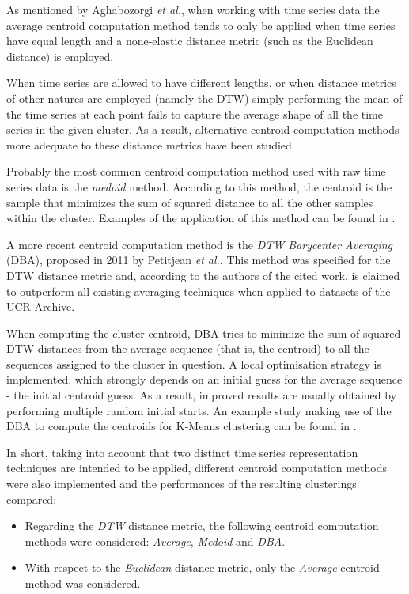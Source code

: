 \documentclass[9pt,journal,compsoc]{IEEEtran}
\begin{document}
As mentioned by Aghabozorgi \emph{et al.}\cite{aghabozorgi2015time}, when working with time series data the average centroid computation method tends to only be applied when time series have equal length and a none-elastic distance metric (such as the Euclidean distance) is employed.

When time series are allowed to have different lengths, or when distance metrics of other natures are employed (namely the DTW) simply performing the mean of the time series at each point fails to capture the average shape of all the time series in the given cluster. As a result, alternative centroid computation methods more adequate to these distance metrics have been studied.

Probably the most common centroid computation method used with raw time series data is the \emph{medoid} method. According to this method, the centroid is the sample that minimizes the sum of squared distance to all the other samples within the cluster. Examples of the application of this method can be found in \cite{liao2006adaptive, izakian2015fuzzy}.

A more recent centroid computation method is the \emph{DTW Barycenter Averaging} (DBA)\cite{petitjean2011global}, proposed in 2011 by Petitjean \emph{et al.}. This method was specified for the DTW distance metric and, according to the authors of the cited work, is claimed to outperform all existing averaging techniques when applied to datasets of the UCR Archive\cite{keogh2006ucr}.

When computing the cluster centroid, DBA tries to minimize the sum of squared DTW distances from the average sequence (that is, the centroid) to all the sequences assigned to the cluster in question. A local optimisation strategy is implemented, which strongly depends on an initial guess for the average sequence - the initial centroid guess. As a result, improved results are usually obtained by performing multiple random initial starts. An example study making use of the DBA to compute the centroids for K-Means clustering can be found in \cite{petitjean2014dynamic}.

In short, taking into account that two distinct time series representation techniques are intended to be applied, different centroid computation methods were also implemented and the performances of the resulting clusterings compared:

\begin{itemize}
	\item Regarding the \emph{DTW} distance metric, the following centroid computation methods were considered: \emph{Average}, \emph{Medoid} and \emph{DBA}.
	
	\item With respect to the \emph{Euclidean} distance metric, only the \emph{Average} centroid method was considered.
\end{itemize}
\end{document}
